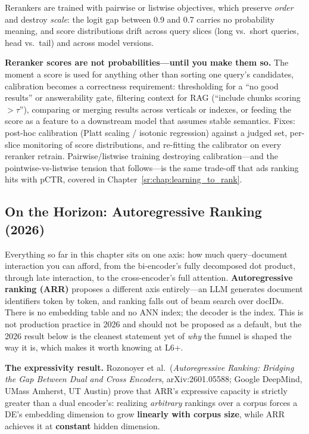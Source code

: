Rerankers are trained with pairwise or listwise objectives, which preserve \textit{order} and destroy \textit{scale}: the logit gap between 0.9 and 0.7 carries no probability meaning, and score distributions drift across query slices (long vs.\ short queries, head vs.\ tail) and across model versions.

\begin{warningbox}
\textbf{Reranker scores are not probabilities---until you make them so.} The moment a score is used for anything other than sorting one query's candidates, calibration becomes a correctness requirement: thresholding for a ``no good results'' or answerability gate, filtering context for RAG (``include chunks scoring $> \tau$''), comparing or merging results across verticals or indexes, or feeding the score as a feature to a downstream model that assumes stable semantics. Fixes: post-hoc calibration (Platt scaling / isotonic regression) against a judged set, per-slice monitoring of score distributions, and re-fitting the calibrator on every reranker retrain. Pairwise/listwise training destroying calibration---and the pointwise-vs-listwise tension that follows---is the same trade-off that ads ranking hits with pCTR, covered in Chapter~\ref{sr:chap:learning_to_rank}.
\end{warningbox}

\subsection{On the Horizon: Autoregressive Ranking (2026)}
\label{sr:subsec:autoregressive_ranking}

Everything so far in this chapter sits on one axis: how much query--document interaction you can afford, from the bi-encoder's fully decomposed dot product, through late interaction, to the cross-encoder's full attention. \textbf{Autoregressive ranking (ARR)} proposes a different axis entirely---an LLM generates document identifiers token by token, and ranking falls out of beam search over docIDs. There is no embedding table and no ANN index; the decoder is the index. This is not production practice in 2026 and should not be proposed as a default, but the 2026 result below is the cleanest statement yet of \textit{why} the funnel is shaped the way it is, which makes it worth knowing at L6+.

\textbf{The expressivity result.} Rozonoyer et al.\ (\textit{Autoregressive Ranking: Bridging the Gap Between Dual and Cross Encoders}, arXiv:2601.05588; Google DeepMind, UMass Amherst, UT Austin) prove that ARR's expressive capacity is strictly greater than a dual encoder's: realizing \textit{arbitrary} rankings over a corpus forces a DE's embedding dimension to grow \textbf{linearly with corpus size}, while ARR achieves it at \textbf{constant} hidden dimension.

